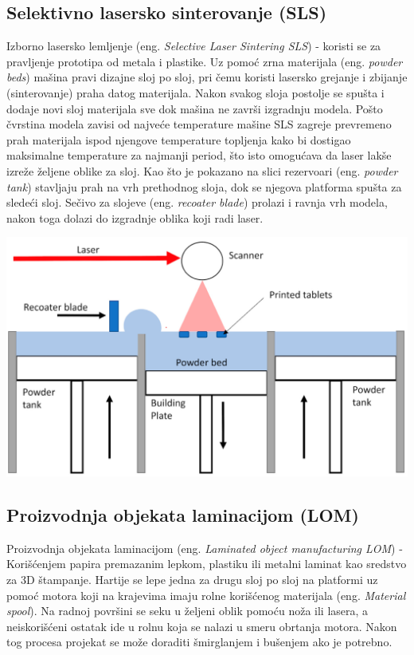 \documentclass[a4paper]{article}
\begin{document}
\subsection{Selektivno lasersko sinterovanje (SLS)\cite{e}}
\label{subsec:podnaslov4}
Izborno lasersko lemljenje (eng. \emph{Selective Laser Sintering SLS}) - koristi se za pravljenje prototipa od metala i plastike. Uz pomoć zrna materijala (eng. \emph{powder beds}) mašina pravi dizajne sloj po sloj, pri čemu koristi lasersko grejanje i zbijanje (sinterovanje) praha datog materijala. 
\bigbreak Nakon svakog sloja postolje se spušta i dodaje novi sloj materijala sve dok mašina ne završi izgradnju modela. Pošto čvrstina modela zavisi od najveće temperature mašine SLS zagreje prevremeno prah materijala ispod njengove temperature topljenja kako bi dostigao maksimalne temperature za najmanji period, što isto omogućava da laser lakše izreže željene oblike za sloj. 
\bigbreak Kao što je pokazano na slici rezervoari (eng. \emph{powder tank}) stavljaju prah na vrh prethodnog sloja, dok se njegova platforma spušta za sledeći sloj.
\bigbreak Sečivo za slojeve (eng. \emph{recoater blade}) prolazi i ravnja vrh modela, nakon toga dolazi do izgradnje oblika koji radi laser. 
\begin{center}
\includegraphics[width=.5\textwidth ]{Tehnikeslike/Sls.png}
\end{center}
\newpage
\subsection{Proizvodnja objekata laminacijom (LOM)\cite{lom}}
\label{subsec:podnaslov5}
Proizvodnja objekata laminacijom (eng. \emph{ Laminated object manufacturing LOM}) - Korišćenjem papira premazanim lepkom, plastiku ili metalni laminat kao sredstvo za 3D štampanje. 
\bigbreak Hartije se lepe jedna za drugu sloj po sloj na platformi uz pomoć motora koji na krajevima imaju rolne korišćenog materijala (eng. \emph{Material spool}).
\bigbreak Na radnoj površini se seku u željeni oblik pomoću noža ili lasera, a neiskorišćeni ostatak ide u rolnu koja se nalazi u smeru obrtanja motora.
\bigbreak Nakon tog procesa projekat se može doraditi šmirglanjem i bušenjem ako je potrebno.
\end{document}

